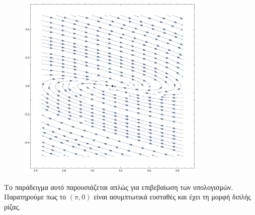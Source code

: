\begin{solution}
\begin{figure}[h]
        \includegraphics[width=0.8\textwidth]{figures/ex10_b_invPendllComb.pdf}
        \caption{}
        \label{fig:ex10_b_invPendllComb}
    \end{figure}
    Το παράδειγμα αυτό παρουσιάζεται απλώς για επιβεβαίωση των υπολογισμών.
    Παρατηρούμε πως το \( (\pi, 0) \) είναι ασυμπτωτικά ευσταθές και έχει τη
    μορφή διπλής ρίζας.
\end{solution}

